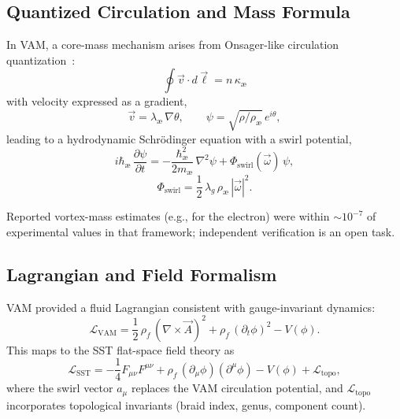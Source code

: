 \documentclass[reprint,aps,onecolumn,nofootinbib]{revtex4-2}
\newcommand{\rhof}{\rho_{\!f}}                           %
\begin{document}
    \subsection{Quantized Circulation and Mass Formula}

        In VAM, a core-mass mechanism arises from Onsager-like circulation quantization~\cite{onsager1949,feynman1955}:
        \begin{equation}
            \oint \vec{v} \cdot d\vec{\ell} = n \, \kappa_\text{\ae}
        \end{equation}
        with velocity expressed as a gradient,
        \begin{equation}
            \vec{v} = \lambda_\text{\ae} \, \nabla \theta, \qquad \psi = \sqrt{\rho/\rho_\text{\ae}}\, e^{i\theta},
        \end{equation}
        leading to a hydrodynamic Schrödinger equation with a swirl potential,
        \begin{equation}
            i\hbar_\text{\ae} \, \frac{\partial \psi}{\partial t} = -\frac{\hbar_\text{\ae}^2}{2m_\text{\ae}} \, \nabla^2 \psi + \Phi_{\text{swirl}}(\vec{\omega})\, \psi,
        \end{equation}
        \begin{equation}
            \Phi_{\text{swirl}} = \frac{1}{2} \, \lambda_g \, \rho_\text{\ae} \, |\vec{\omega}|^2.
        \end{equation}

        Reported vortex-mass estimates (e.g., for the electron) were within $\sim 10^{-7}$ of experimental values in that framework; independent verification is an open task.

    \subsection{Lagrangian and Field Formalism}

        VAM provided a fluid Lagrangian consistent with gauge-invariant dynamics:
        \begin{equation}
            \mathcal{L}_\text{VAM} = \frac{1}{2} \, \rhof \, (\nabla \times \vec{A})^2 + \rhof \, (\partial_t \phi)^2 - V(\phi).
        \end{equation}
        This maps to the SST flat-space field theory as
        \begin{equation}
            \mathcal{L}_\text{SST} = -\frac{1}{4} F_{\mu\nu} F^{\mu\nu} + \rhof \, (\partial_\mu \phi)(\partial^\mu \phi) - V(\phi) + \mathcal{L}_{\text{topo}},
        \end{equation}
        where the swirl vector $a_\mu$ replaces the VAM circulation potential, and $\mathcal{L}_{\text{topo}}$ incorporates topological invariants (braid index, genus, component count).
\end{document}
